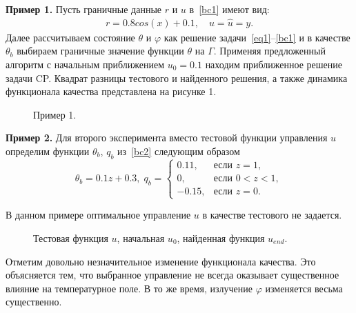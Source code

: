 \documentclass[12pt]{article}
\begin{document}
    \textbf{Пример 1.}
    Пусть граничные данные $r$ и $u$ в~\eqref{bc1} имеют вид:
    \begin{gather*}
        r = 0.8 cos(x) + 0.1,\quad
        u = \hat u = y.
    \end{gather*}
    Далее рассчитываем состояние $\theta$ и $\varphi$ как решение задачи~\eqref{eq1}--\eqref{bc1} и в качестве
    $\theta_b$ выбираем граничные значение функции $\theta$ на $\Gamma$.
    Применяя предложенный алгоритм с начальным приближением $u_0 = 0.1$ находим приближенное решение задачи CP\@.
    Квадрат разницы тестового и найденного решения, а также динамика функционала качества представлена на рисунке 1.

    \begin{figure}[H]
        \centering
        \caption{Пример 1.}
        \label{img_control_1}
    \end{figure}

    \textbf{Пример 2.}
    Для второго эксперимента вместо тестовой функции управления $u$
    определим функции $\theta_b$, $q_b$ из~\eqref{bc2} следующим образом
    \[
        \theta_b = 0.1z + 0.3, \;
        q_b =
        \begin{cases}
            0.11, & \text{если } z = 1,\\
            0, & \text{если } 0 < z < 1,\\
            -0.15, & \text{если } z = 0.
        \end{cases}
    \]

    В данном примере оптимальное управление $u$ в качестве тестового не задается.

    \begin{figure}[H]
        \centering
        \caption{Тестовая функция $u$, начальная $u_0$, найденная функция $u_{end}.$}
        \label{img_control_2}
    \end{figure}
    Отметим довольно незначительное изменение функционала качества.
    Это объясняется тем, что выбранное управление не всегда оказывает существенное влияние на температурное поле.
    В то же время, излучение $\varphi$ изменяется весьма существенно.
\end{document}
